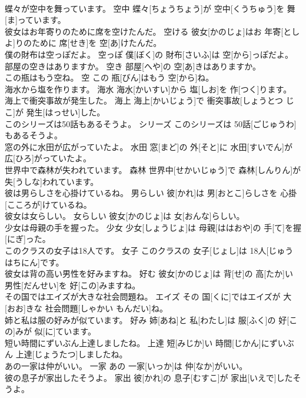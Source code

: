 \documentclass[8pt]{extreport}
\begin{document}
\begin{CJK}{UTF8}{min}
\\	蝶々が空中を舞っています。	空中	蝶々[ちょうちょう]が 空中[くうちゅう]を 舞[ま]っています。	
\\	彼女はお年寄りのために席を空けたんだ。	空ける	彼女[かのじょ]はお 年寄[としよ]りのために 席[せき]を 空[あ]けたんだ。	
\\	僕の財布は空っぽだよ。	空っぽ	僕[ぼく]の 財布[さいふ]は 空[から]っぽだよ。	
\\	部屋の空きはありますか。	空き	部屋[へや]の 空[あ]きはありますか。	
\\	この瓶はもう空ね。	空	この 瓶[びん]はもう 空[から]ね。	
\\	海水から塩を作ります。	海水	海水[かいすい]から 塩[しお]を 作[つく]ります。	
\\	海上で衝突事故が発生した。	海上	海上[かいじょう]で 衝突事故[しょうとつ じこ]が 発生[はっせい]した。	
\\	このシリーズは50話もあるそうよ。	シリーズ	このシリーズは 50話[ごじゅうわ]もあるそうよ。	
\\	窓の外に水田が広がっていたよ。	水田	窓[まど]の 外[そと]に 水田[すいでん]が 広[ひろ]がっていたよ。	
\\	世界中で森林が失われています。	森林	世界中[せかいじゅう]で 森林[しんりん]が 失[うしな]われています。	
\\	彼は男らしさを心掛けているね。	男らしい	彼[かれ]は 男[おとこ]らしさを 心掛[こころが]けているね。	
\\	彼女は女らしい。	女らしい	彼女[かのじょ]は 女[おんな]らしい。	
\\	少女は母親の手を握った。	少女	少女[しょうじょ]は 母親[ははおや]の 手[て]を握[にぎ]った。	
\\	このクラスの女子は18人です。	女子	このクラスの 女子[じょし]は 18人[じゅうはちにん]です。	
\\	彼女は背の高い男性を好みますね。	好む	彼女[かのじょ]は 背[せ]の 高[たか]い 男性[だんせい]を 好[この]みますね。	
\\	その国ではエイズが大きな社会問題ね。	エイズ	その 国[くに]ではエイズが 大[おお]きな 社会問題[しゃかい もんだい]ね。	
\\	姉と私は服の好みが似ています。	好み	姉[あね]と 私[わたし]は 服[ふく]の 好[この]みが 似[に]ています。	
\\	短い時間にずいぶん上達しましたね。	上達	短[みじか]い 時間[じかん]にずいぶん 上達[じょうたつ]しましたね。	
\\	あの一家は仲がいい。	一家	あの 一家[いっか]は 仲[なか]がいい。	
\\	彼の息子が家出したそうよ。	家出	彼[かれ]の 息子[むすこ]が 家出[いえで]したそうよ。	

\end{CJK}
\end{document}
